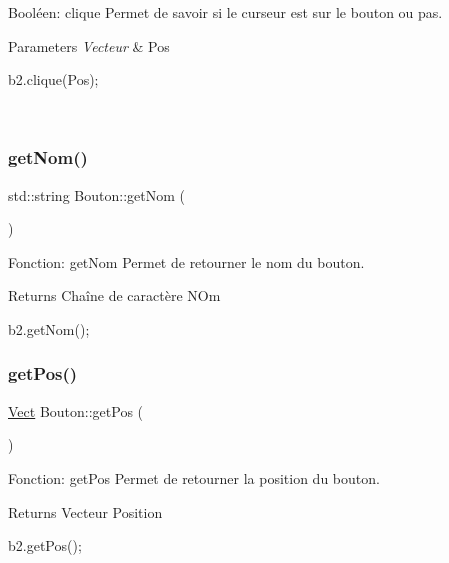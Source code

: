 Booléen\+: clique Permet de savoir si le curseur est sur le bouton ou pas. 


\begin{DoxyParams}{Parameters}
{\em Vecteur} & Pos 
\begin{DoxyCode}
b2.clique(Pos);
\end{DoxyCode}
 \\
\hline
\end{DoxyParams}
\mbox{\label{classBouton_a84818c161e6ea4ee6d58ccc53d57d802}} 
\subsubsection{\texorpdfstring{get\+Nom()}{getNom()}}
{\footnotesize\ttfamily std\+::string Bouton\+::get\+Nom (\begin{DoxyParamCaption}{ }\end{DoxyParamCaption})}



Fonction\+: get\+Nom Permet de retourner le nom du bouton. 

\begin{DoxyReturn}{Returns}
Chaîne de caractère N\+Om 
\begin{DoxyCode}
b2.getNom();
\end{DoxyCode}
 
\end{DoxyReturn}
\mbox{\label{classBouton_a98c3ba829a653f51ef8079395bbe061c}} 
\subsubsection{\texorpdfstring{get\+Pos()}{getPos()}}
{\footnotesize\ttfamily \hyperlink{classVect}{Vect} Bouton\+::get\+Pos (\begin{DoxyParamCaption}{ }\end{DoxyParamCaption})}



Fonction\+: get\+Pos Permet de retourner la position du bouton. 

\begin{DoxyReturn}{Returns}
Vecteur Position 
\begin{DoxyCode}
b2.getPos();
\end{DoxyCode}
 
\end{DoxyReturn}
\mbox{\label{classBouton_af8d5683f32e115bd8d709bbfd6965b54}} 
